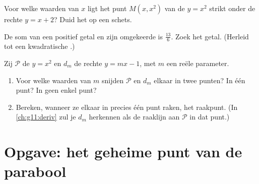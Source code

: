 \begin{exercise}[$\star\star$]\label{exo:g11:quad:9}
Voor welke waarden van $x$ ligt het punt $M(x, x^2)$ van de 
$y = x^2$ strikt onder de rechte $y = x + 2$? Duid het op een schets.
\end{exercise}

\begin{exercise}[$\star\star$]\label{exo:g11:quad:10}
De som van een positief getal en zijn omgekeerde is $\frac{13}{6}$. Zoek het
getal. (Herleid tot een kwadratische .)
\end{exercise}

\begin{exercise}[$\star\star\star$]\label{exo:g11:quad:11}
Zij $\mathcal P$ de  $y = x^2$ en $d_m$ de rechte $y = mx - 1$, met
$m$ een reële parameter.
\begin{enumerate}
  \item Voor welke waarden van $m$ snijden $\mathcal P$ en $d_m$ elkaar in
        twee punten? In één punt? In geen enkel punt?
  \item Bereken, wanneer ze elkaar in precies één punt raken, het raakpunt.
        (In \cref{ch:g11:deriv} zul je $d_m$ herkennen als de raaklijn aan
        $\mathcal P$ in dat punt.)
\end{enumerate}
\end{exercise}

\section{Opgave: het geheime punt van de parabool}

